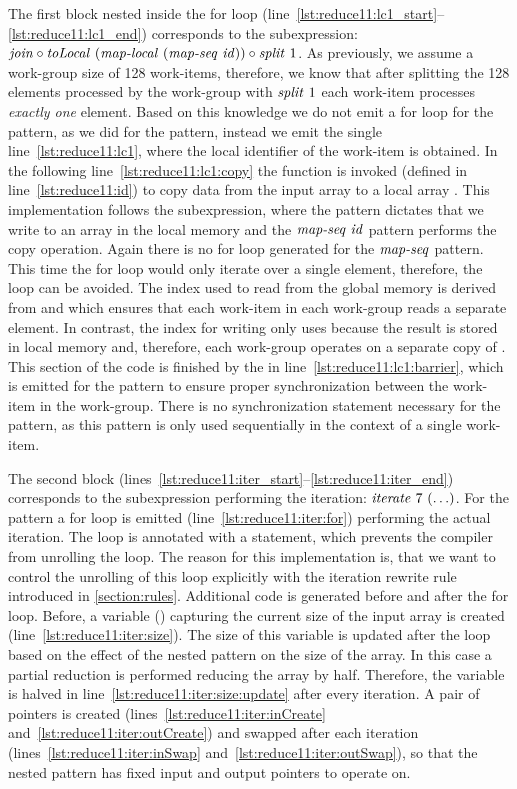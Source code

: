 The first block nested inside the for loop (line~\ref{lst:reduce11:lc1_start}--\ref{lst:reduce11:lc1_end}) corresponds to the subexpression:
$\text{\textit{join}} \circ \text{\textit{toLocal}}\ (\text{\textit{map-local}}\ (\text{\textit{map-seq}}\ \text{\textit{id}})) \circ \text{\textit{split}}\ 1$.
As previously, we assume a work-group size of 128 work-items, therefore, we know that after splitting the 128 elements processed by the work-group with $\text{\textit{split}}\ 1$ each work-item processes \emph{exactly one} element.
Based on this knowledge we do not emit a for loop for the \mapLocal pattern, as we did for the \mapWorkgroup pattern, instead we emit the single line~\ref{lst:reduce11:lc1}, where the local identifier of the work-item is obtained.
In the following line~\ref{lst:reduce11:lc1:copy} the  function is invoked (defined in line~\ref{lst:reduce11:id}) to copy data from the input array to a local array .
This implementation follows the subexpression, where the \toLocal pattern dictates that we write to an array in the local memory and the $\text{\textit{map-seq}}\ \text{\textit{id}}$ pattern performs the copy operation.
Again there is no for loop generated for the $\text{\textit{map-seq}}$ pattern.
This time the for loop would only iterate over a single element, therefore, the loop can be avoided.
The index used to read from the global memory is derived from  and  which ensures that each work-item in each work-group reads a separate element.
In contrast, the index for writing only uses  because the result is stored in local memory and, therefore, each work-group operates on a separate copy of .
This section of the code is finished by the  in line~\ref{lst:reduce11:lc1:barrier}, which is emitted for the \mapLocal pattern to ensure proper synchronization between the work-item in the work-group.
There is no synchronization statement necessary for the \mapSeq pattern, as this pattern is only used sequentially in the context of a single work-item.

The second block (lines~\ref{lst:reduce11:iter_start}--\ref{lst:reduce11:iter_end}) corresponds to the subexpression performing the iteration:
$\text{\textit{iterate}}\ 7\ (\ldots)$.
For the \iterateN pattern a for loop is emitted (line~\ref{lst:reduce11:iter:for}) performing the actual iteration.
The loop is annotated with a  statement, which prevents the \OpenCL compiler from unrolling the loop.
The reason for this implementation is, that we want to control the unrolling of this loop explicitly with the iteration rewrite rule introduced in \autoref{section:rules}.
Additional code is generated before and after the for loop.
Before, a variable () capturing the current size of the input array is created (line~\ref{lst:reduce11:iter:size}).
The size of this variable is updated after the loop based on the effect of the nested pattern on the size of the array.
In this case a partial reduction is performed reducing the array by half.
Therefore, the  variable is halved in line~\ref{lst:reduce11:iter:size:update} after every iteration.
A pair of pointers is created (lines~\ref{lst:reduce11:iter:inCreate} and~\ref{lst:reduce11:iter:outCreate}) and swapped after each iteration (lines~\ref{lst:reduce11:iter:inSwap} and~\ref{lst:reduce11:iter:outSwap}), so that the nested pattern has fixed input and output pointers to operate on.

